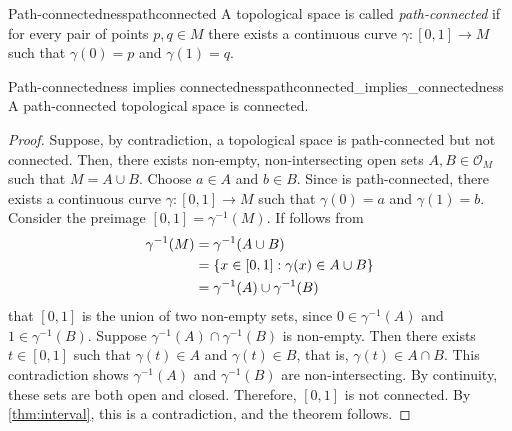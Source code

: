 \begin{definition}{Path-connectedness}{pathconnected}
    A topological space  is called \emph{path-connected} if for every pair of points \(p, q\in M\) there exists a continuous curve \(\gamma : [0, 1] \to M\) such that \(\gamma (0) = p\) and \(\gamma(1) = q\).
\end{definition}

\begin{theorem}{Path-connectedness implies connectedness}{pathconnected_implies_connectedness}
    A path-connected topological space is connected.
\end{theorem}
\begin{proof}
    Suppose, by contradiction, a topological space  is path-connected but not connected. Then, there exists non-empty, non-intersecting open sets \(A, B \in \mathcal{O}_M\) such that \(M = A \cup B\). Choose \(a \in A\) and \(b \in B\). Since  is path-connected, there exists a continuous curve \(\gamma: [0,1] \to M\) such that \(\gamma(0) = a\) and \(\gamma(1) = b\). Consider the preimage \([0,1] = \gamma^{-1}(M)\). If follows from
    \begin{align*}
        \gamma^{-1}(M) &= \gamma^{-1}(A\cup B)\\
                       &= \set*{x \in [0,1] : \gamma(x) \in A \cup B}\\
                       &= \gamma^{-1}(A) \cup \gamma^{-1}(B)
    \end{align*}
    that \([0,1]\) is the union of two non-empty sets, since \(0 \in \gamma^{-1}(A)\) and \(1 \in \gamma^{-1}(B)\). Suppose \(\gamma^{-1}(A) \cap \gamma^{-1}(B)\) is non-empty. Then there exists \(t \in [0,1]\) such that \(\gamma(t) \in A\) and \(\gamma(t) \in B\), that is, \(\gamma(t) \in A \cap B\). This contradiction shows \(\gamma^{-1}(A)\) and \(\gamma^{-1}(B)\) are non-intersecting. By continuity, these sets are both open and closed. Therefore, \([0,1]\) is not connected. By \cref{thm:interval}, this is a contradiction, and the theorem follows.
\end{proof}
